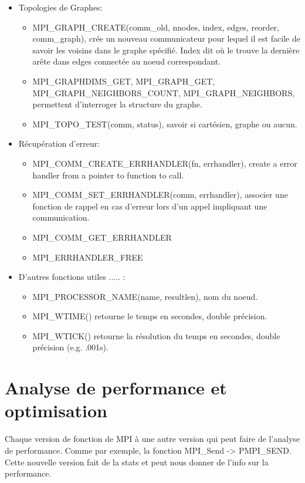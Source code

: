 \documentclass[oneside]{book}
\begin{document}
\begin{itemize}
\item Topologies de Graphes:\\
\begin{itemize}
\item MPI\_GRAPH\_CREATE(comm\_old, nnodes, index, edges, reorder,
comm\_graph), crée un nouveau communicateur pour lequel il est
facile de savoir les voisins dans le graphe spécifié. Index dit où le
trouve la dernière arête dans edges connectée au noeud
correspondant.

\item MPI\_GRAPHDIMS\_GET, MPI\_GRAPH\_GET,
MPI\_GRAPH\_NEIGHBORS\_COUNT, MPI\_GRAPH\_NEIGHBORS,
permettent d'interroger la structure du graphe.

\item MPI\_TOPO\_TEST(comm, status), savoir si cartésien, graphe ou
aucun.
\end{itemize}

\item Récupération d'erreur:\\
\begin{itemize}
\item MPI\_COMM\_CREATE\_ERRHANDLER(fn, errhandler),
create a error handler from a pointer to function to call.

\item MPI\_COMM\_SET\_ERRHANDLER(comm, errhandler),
associer une fonction de rappel en cas d'erreur lors d'un
appel impliquant une communication.

\item MPI\_COMM\_GET\_ERRHANDLER

\item MPI\_ERRHANDLER\_FREE
\end{itemize}

\item D'autres fonctions utiles ..... :\\
\begin{itemize}
\item MPI\_PROCESSOR\_NAME(name, resultlen), nom du
noeud.
\item MPI\_WTIME() retourne le temps en secondes, double
précision.

\item MPI\_WTICK() retourne la résolution du temps en
secondes, double précision (e.g. .001s).
\end{itemize}
\end{itemize}

\section{Analyse de performance et optimisation}
Chaque version de fonction de MPI à une autre version qui peut faire de l'analyse de performance. Comme par exemple, la fonction MPI\_Send -> PMPI\_SEND. Cette nouvelle version fait de la stats et peut nous donner de l'info sur la performance.\\
\end{document}
